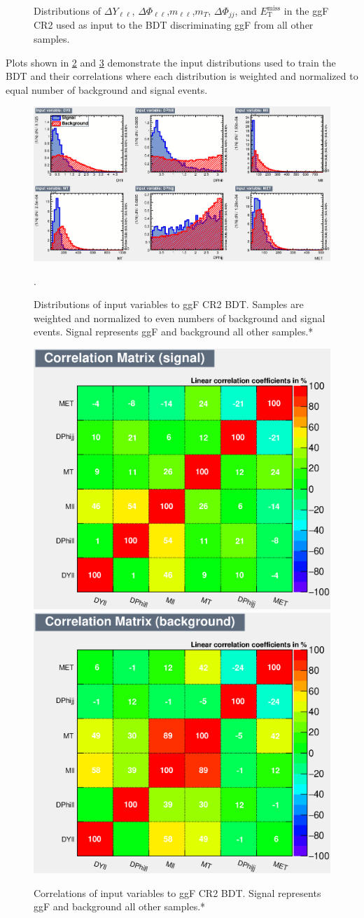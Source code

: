 \begin{figure}[!h]
{  }\hfill
{\caption{Distributions of $\Delta Y_{\ell\ell}$, $\Delta \Phi_{\ell\ell}$,$m_{\ell\ell}$,$m_T$, $\Delta \Phi_{jj}$, and $\ensuremath{E_{\text{T}}^{\text{miss}}}$ in the ggF CR2 used as input to the BDT discriminating ggF from all other samples.
\label{fig:ggFCR2}}}
\end{figure} 

Plots shown in \ref{fig:ggFCR2BDTinput} and \ref{fig:ggFCR2corrSB} demonstrate the input distributions used to train the BDT and their correlations where each distribution is weighted and normalized to equal number of background and signal events. 

\begin{figure}[!htbp]
    \centering
    \includegraphics[width=0.5\linewidth]{Pictures/ggFCR2/variables_id_c1.eps}
    \caption{Distributions of input variables to ggF CR2 BDT. Samples are weighted and normalized to even numbers of background and signal events. Signal represents ggF and background all other samples.*}.
    \label{fig:ggFCR2BDTinput}
\end{figure}
\begin{figure}[!htbp]
\centering
  \includegraphics[width=.3\linewidth]{Pictures/ggFCR2/CorrelationMatrixS.eps}
  \includegraphics[width=.3\linewidth]{Pictures/ggFCR2/CorrelationMatrixB.eps}
\caption{Correlations of input variables to ggF CR2 BDT. Signal represents ggF and background all other samples.*}
\label{fig:ggFCR2corrSB}
\end{figure}

